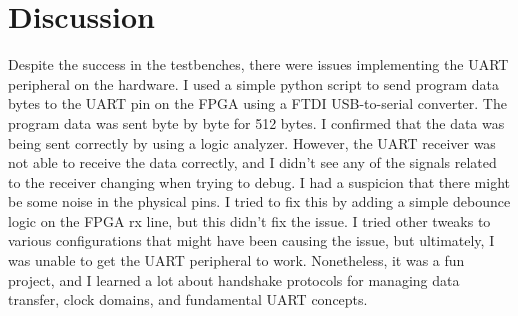 \section{Discussion}

Despite the success in the testbenches, there were issues implementing the UART peripheral on the hardware.
I used a simple python script to send program data bytes to the UART pin on the FPGA using a FTDI USB-to-serial converter.
The program data was sent byte by byte for 512 bytes.
I confirmed that the data was being sent correctly by using a logic analyzer.
However, the UART receiver was not able to receive the data correctly, and I didn't see any of the signals related to the receiver changing when trying to debug.
I had a suspicion that there might be some noise in the physical pins.
I tried to fix this by adding a simple debounce logic on the FPGA rx line, but this didn't fix the issue.
I tried other tweaks to various configurations that might have been causing the issue, but ultimately, I was unable to get the UART peripheral to work.
Nonetheless, it was a fun project, and I learned a lot about handshake protocols for managing data transfer, clock domains, and fundamental UART concepts.

